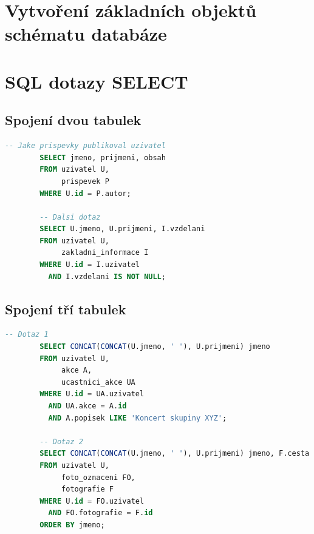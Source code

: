 \documentclass[11pt,a4paper]{article}
\begin{document}
\section{Vytvoření základních objektů schématu databáze}

\section{SQL dotazy SELECT}

\subsection{Spojení dvou tabulek}
\begin{minipage}{\linewidth}
    \begin{center}
        \begin{lstlisting}[language=sql]
        -- Jake prispevky publikoval uzivatel
        SELECT jmeno, prijmeni, obsah
        FROM uzivatel U,
             prispevek P
        WHERE U.id = P.autor;
        
        -- Dalsi dotaz
        SELECT U.jmeno, U.prijmeni, I.vzdelani
        FROM uzivatel U,
             zakladni_informace I
        WHERE U.id = I.uzivatel
          AND I.vzdelani IS NOT NULL;\end{lstlisting}
    \end{center}
\end{minipage}

\subsection{Spojení tří tabulek}
\begin{minipage}{\linewidth}
    \begin{center}
        \begin{lstlisting}[language=sql]
        -- Dotaz 1
        SELECT CONCAT(CONCAT(U.jmeno, ' '), U.prijmeni) jmeno
        FROM uzivatel U,
             akce A,
             ucastnici_akce UA
        WHERE U.id = UA.uzivatel
          AND UA.akce = A.id
          AND A.popisek LIKE 'Koncert skupiny XYZ';
          
        -- Dotaz 2
        SELECT CONCAT(CONCAT(U.jmeno, ' '), U.prijmeni) jmeno, F.cesta foto
        FROM uzivatel U,
             foto_oznaceni FO,
             fotografie F
        WHERE U.id = FO.uzivatel
          AND FO.fotografie = F.id
        ORDER BY jmeno;\end{lstlisting}
    \end{center}
\end{minipage}
\end{document}
